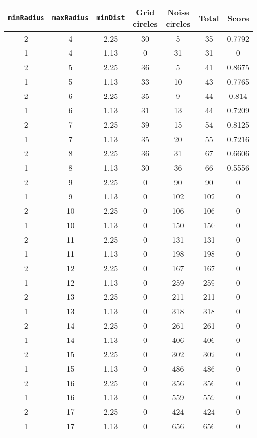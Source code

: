 \documentclass[letterpaper, 12pt]{article}
\begin{document}
\begin{longtable}{|c|c|c|c|c|c|c|}
\hline
\textbf{\texttt{minRadius}} & \textbf{\texttt{maxRadius}} & \textbf{\texttt{minDist}} & \textbf{Grid circles} & \textbf{Noise circles} & \textbf{Total} & \textbf{Score} \\
\hline
2 & 4 & 2.25 & 30 & 5 & 35 & 0.7792 \\
\hline
1 & 4 & 1.13 & 0 & 31 & 31 & 0 \\
\hline
2 & 5 & 2.25 & 36 & 5 & 41 & 0.8675 \\
\hline
1 & 5 & 1.13 & 33 & 10 & 43 & 0.7765 \\
\hline
2 & 6 & 2.25 & 35 & 9 & 44 & 0.814 \\
\hline
1 & 6 & 1.13 & 31 & 13 & 44 & 0.7209 \\
\hline
2 & 7 & 2.25 & 39 & 15 & 54 & 0.8125 \\
\hline
1 & 7 & 1.13 & 35 & 20 & 55 & 0.7216 \\
\hline
2 & 8 & 2.25 & 36 & 31 & 67 & 0.6606 \\
\hline
1 & 8 & 1.13 & 30 & 36 & 66 & 0.5556 \\
\hline
2 & 9 & 2.25 & 0 & 90 & 90 & 0 \\
\hline
1 & 9 & 1.13 & 0 & 102 & 102 & 0 \\
\hline
2 & 10 & 2.25 & 0 & 106 & 106 & 0 \\
\hline
1 & 10 & 1.13 & 0 & 150 & 150 & 0 \\
\hline
2 & 11 & 2.25 & 0 & 131 & 131 & 0 \\
\hline
1 & 11 & 1.13 & 0 & 198 & 198 & 0 \\
\hline
2 & 12 & 2.25 & 0 & 167 & 167 & 0 \\
\hline
1 & 12 & 1.13 & 0 & 259 & 259 & 0 \\
\hline
2 & 13 & 2.25 & 0 & 211 & 211 & 0 \\
\hline
1 & 13 & 1.13 & 0 & 318 & 318 & 0 \\
\hline
2 & 14 & 2.25 & 0 & 261 & 261 & 0 \\
\hline
1 & 14 & 1.13 & 0 & 406 & 406 & 0 \\
\hline
2 & 15 & 2.25 & 0 & 302 & 302 & 0 \\
\hline
1 & 15 & 1.13 & 0 & 486 & 486 & 0 \\
\hline
2 & 16 & 2.25 & 0 & 356 & 356 & 0 \\
\hline
1 & 16 & 1.13 & 0 & 559 & 559 & 0 \\
\hline
2 & 17 & 2.25 & 0 & 424 & 424 & 0 \\
\hline
1 & 17 & 1.13 & 0 & 656 & 656 & 0 \\

\end{longtable}
\end{document}
